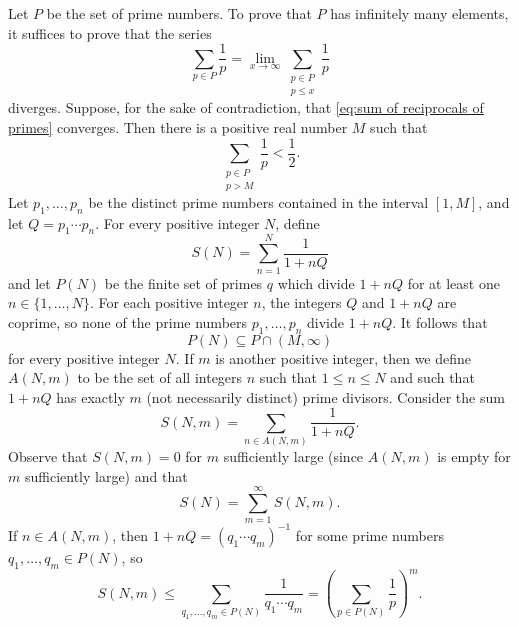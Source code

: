 \documentclass{homework}
\begin{document}
\begin{solution}
Let $P$ be the set of prime numbers.
To prove that $P$ has infinitely many elements, it suffices to prove
that the series
\begin{equation}
\label{eq:sum of reciprocals of primes}
\sum_{p \in P} \frac{1}{p}
= \lim_{x \to \infty} \sum_{\substack{p \in P \\ p \leq x}} \frac{1}{p}
\end{equation}
diverges.
Suppose, for the sake of contradiction, that
\eqref{eq:sum of reciprocals of primes} converges.
Then there is a positive real number $M$ such that
\begin{equation}
\label{eq:tail of sum of reciprocals of primes}
\sum_{\substack{p \in P \\ p > M}} \frac{1}{p} < \frac{1}{2}.
\end{equation}
Let $p_1,\ldots,p_n$ be the distinct prime numbers contained in the interval
$[1,M]$, and let $Q = p_1 \cdots p_n$.
For every positive integer $N$, define
\begin{equation*}
S(N) = \sum_{n=1}^N \frac{1}{1 + n Q}
\end{equation*}
and let $P(N)$ be the finite set of primes $q$ which divide $1 + n Q$ for at
least one $n \in \{1,\ldots,N\}$.
For each positive integer $n$, the integers $Q$ and $1 + n Q$ are coprime, so
none of the prime numbers $p_1,\ldots,p_n$ divide $1 + n Q$.
It follows that
\begin{equation}
\label{eq:P(N) subset}
P(N) \subseteq P \cap (M, \infty)
\end{equation}
for every positive integer $N$.
If $m$ is another positive integer, then we define $A(N, m)$ to be the set of
all integers $n$ such that $1 \leq n \leq N$ and such that $1 + n Q$ has exactly
$m$ (not necessarily distinct) prime divisors.
Consider the sum
\begin{equation*}
S(N, m) = \sum_{n \in A(N, m)} \frac{1}{1 + n Q}.
\end{equation*}
Observe that $S(N, m) = 0$ for $m$ sufficiently large (since $A(N,m)$ is empty
for $m$ sufficiently large) and that
\begin{equation}
\label{eq:S(N) as sum}
S(N)
= \sum_{m=1}^\infty S(N, m).
\end{equation}
If $n \in A(N, m)$, then $1 + n Q =  (q_1\cdots q_m)^{-1}$ for some prime
numbers $q_1,\ldots,q_m \in P(N)$, so
\begin{equation*}
S(N, m)
\leq \sum_{q_1,\ldots,q_m \in P(N)} \frac{1}{q_1\cdots q_m}
= \left(\sum_{p \in P(N)} \frac{1}{p}\right)^{m}.

\end{equation*}
\end{solution}
\end{document}
